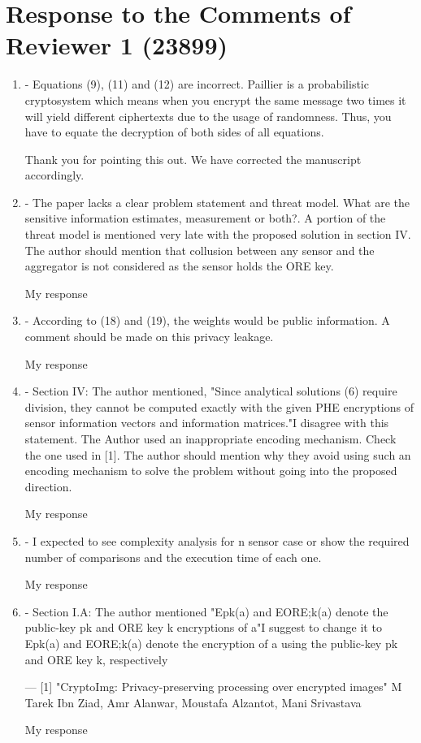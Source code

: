 \documentclass[a4paper]{scrartcl}
\newenvironment{rebuttal}{\begin{enumerate}[label={\color{grey}\thesection.\arabic{enumi}},leftmargin=0pt,ref=\thesection.\arabic{enumi}]}{\end{enumerate}}
\newcommand{\reviewtext}[1]{{\color{nblue} #1}}
\begin{document}
\section*{Response to the Comments of Reviewer 1 (23899)}
\def\thesection{R1}
\begin{rebuttal}
\item \reviewtext{- Equations (9), (11) and (12) are incorrect. Paillier is a
probabilistic cryptosystem which means when you encrypt the same
message two times it will yield different ciphertexts due to the usage
of randomness. Thus, you have to equate the decryption of both sides of
all equations. }

Thank you for pointing this out. We have corrected the manuscript accordingly.

\item \reviewtext{- The paper lacks a clear problem statement and threat model. What are
the sensitive information estimates, measurement or both?. A portion of
the threat model is mentioned very late with the proposed solution in
section IV. The author should mention that collusion between any sensor
and the aggregator is not considered as the sensor holds the ORE key. }

My response

\item \reviewtext{- According to (18) and (19), the weights would be public information.
A comment should be made on this privacy leakage.}

My response

\item \reviewtext{- Section IV: The author mentioned, "Since analytical solutions (6)
require division, they cannot be computed exactly with the given PHE
encryptions of sensor information vectors and information matrices."I
disagree with this statement. The Author used an inappropriate encoding
mechanism. Check the one used in [1]. The author should mention why
they avoid using such an encoding mechanism to solve the problem
without going into the proposed direction. }

My response

\item \reviewtext{- I expected to see complexity analysis for n sensor case or show the
required number of comparisons and the execution time of each one. }

My response

\item \reviewtext{- Section I.A: The author mentioned 
"Epk(a) and EORE;k(a) denote the public-key pk and ORE key k
encryptions of a"I suggest to change it to 
Epk(a) and EORE;k(a) denote the encryption of a using the public-key pk
and ORE key k, respectively

---
[1] "CryptoImg: Privacy-preserving processing over encrypted images" M
Tarek Ibn Ziad, Amr Alanwar, Moustafa Alzantot, Mani Srivastava}

My response

\end{rebuttal}
\end{document}
